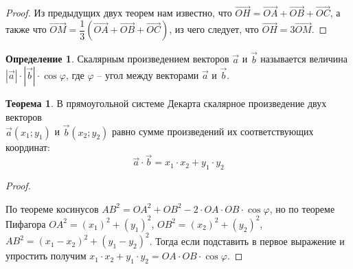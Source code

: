 \documentclass[12pt]{article}
\theoremstyle{definition}
\newtheorem{theorem}{Теорема}[section]
\newtheorem{definition}{Определение}
\begin{document}
    \begin{proof}
        Из предыдущих двух теорем нам известно, что $\overrightarrow{OH}=\overrightarrow{OA}+\overrightarrow{OB}+\overrightarrow{OC}$, а также что $\overrightarrow{OM}=\dfrac{1}{3}(\overrightarrow{OA}+\overrightarrow{OB}+\overrightarrow{OC})$, из чего следует, что $\overrightarrow{OH}=3\overrightarrow{OM}$.
    \end{proof}

\begin{definition}
    Скалярным произведением векторов $\vec{a}$ и $\vec{b}$ называется величина $|\vec{a}|\cdot |\vec{b}|\cdot \cos \varphi$, где $\varphi$ -- угол между векторами $\vec{a}$ и $\vec{b}$.
\end{definition}

\begin{theorem}
    В прямоугольной системе Декарта скалярное произведение двух векторов\\ $\vec{a}(x_1;y_1)$ и $\vec{b}(x_2;y_2)$ равно сумме произведений их соответствующих координат: 
    $$\vec{a}\cdot \vec{b}=x_1\cdot x_2 + y_1\cdot y_2$$
\end{theorem}
    \begin{proof}
    $ $\par\nobreak\ignorespaces
    \begin{center}
    \end{center}
        По теореме косинусов $AB^2=OA^2+OB^2-2\cdot OA\cdot OB \cdot \cos \varphi$, но по теореме Пифагора $OA^2=(x_1)^2+(y_1)^2$, $OB^2=(x_2)^2+(y_2)^2$, $AB^2=(x_1-x_2)^2+(y_1-y_2)^2$. Тогда если подставить в первое выражение и упростить получим $x_1\cdot x_2 + y_1\cdot y_2=OA\cdot OB\cdot \cos \varphi$.
    \end{proof}
\end{document}
